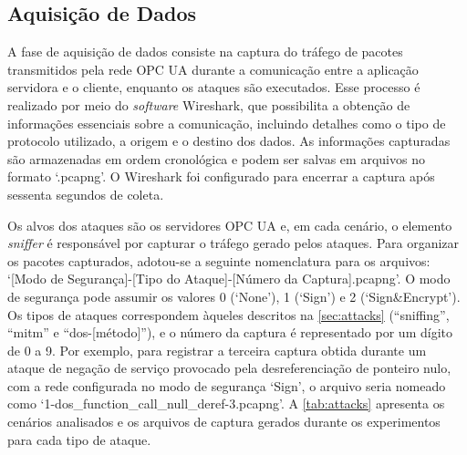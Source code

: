     \subsection{Aquisição de Dados} \label{sec:aquisicao}

        A fase de aquisição de dados consiste na captura do tráfego de pacotes transmitidos pela rede OPC UA durante a comunicação entre a aplicação servidora e o cliente, enquanto os ataques são executados. Esse processo é realizado por meio do \textit{software} Wireshark, que possibilita a obtenção de informações essenciais sobre a comunicação, incluindo detalhes como o tipo de protocolo utilizado, a origem e o destino dos dados. As informações capturadas são armazenadas em ordem cronológica e podem ser salvas em arquivos no formato `.pcapng'. O Wireshark foi configurado para encerrar a captura após sessenta segundos de coleta.

        Os alvos dos ataques são os servidores OPC UA e, em cada cenário, o elemento \textit{sniffer} é responsável por capturar o tráfego gerado pelos ataques. Para organizar os pacotes capturados, adotou-se a seguinte nomenclatura para os arquivos: `[Modo de Segurança]-[Tipo do Ataque]-[Número da Captura].pcapng'. O modo de segurança pode assumir os valores 0 (`None'), 1 (`Sign') e 2 (`Sign\&Encrypt'). Os tipos de ataques correspondem àqueles descritos na \autoref{sec:attacks} (``sniffing'', ``mitm'' e ``dos-[método]''), e o número da captura é representado por um dígito de 0 a 9. Por exemplo, para registrar a terceira captura obtida durante um ataque de negação de serviço provocado pela desreferenciação de ponteiro nulo, com a rede configurada no modo de segurança `Sign', o arquivo seria nomeado como `1-dos\_function\_call\_null\_deref-3.pcapng'. A \autoref{tab:attacks} apresenta os cenários analisados e os arquivos de captura gerados durante os experimentos para cada tipo de ataque.

